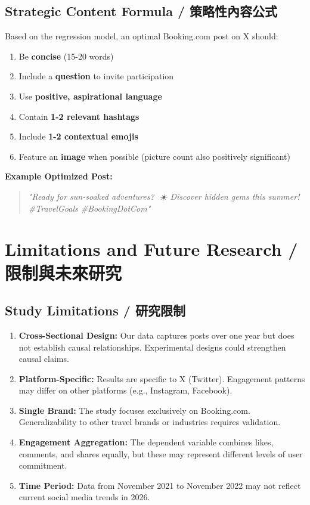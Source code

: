 \documentclass[12pt,a4paper,fontset=none]{ctexart}
\begin{document}
\subsection{Strategic Content Formula / 策略性內容公式}

Based on the regression model, an optimal Booking.com post on X should:

\begin{enumerate}
    \item Be \textbf{concise} (15-20 words)
    \item Include a \textbf{question} to invite participation
    \item Use \textbf{positive, aspirational language}
    \item Contain \textbf{1-2 relevant hashtags}
    \item Include \textbf{1-2 contextual emojis}
    \item Feature an \textbf{image} when possible (picture count also positively significant)
\end{enumerate}

\textbf{Example Optimized Post:}
\begin{quote}
\textit{"Ready for sun-soaked adventures? 🌴☀️ Discover hidden gems this summer! \#TravelGoals \#BookingDotCom"}
\end{quote}

\newpage

\section{Limitations and Future Research / 限制與未來研究}

\subsection{Study Limitations / 研究限制}

\begin{enumerate}
    \item \textbf{Cross-Sectional Design:} Our data captures posts over one year but does not establish causal relationships. Experimental designs could strengthen causal claims.

    \item \textbf{Platform-Specific:} Results are specific to X (Twitter). Engagement patterns may differ on other platforms (e.g., Instagram, Facebook).

    \item \textbf{Single Brand:} The study focuses exclusively on Booking.com. Generalizability to other travel brands or industries requires validation.

    \item \textbf{Engagement Aggregation:} The dependent variable combines likes, comments, and shares equally, but these may represent different levels of user commitment.

    \item \textbf{Time Period:} Data from November 2021 to November 2022 may not reflect current social media trends in 2026.
\end{enumerate}
\end{document}
